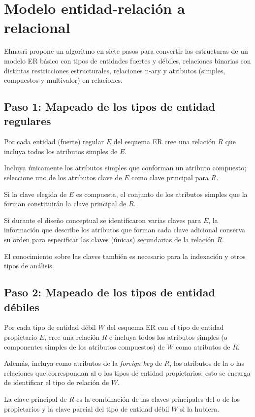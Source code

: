 \section{Modelo entidad-relación a relacional}
Elmasri\cite{ramez_elmasri_fundamentos_nodate} propone un algoritmo en siete pasos para convertir las estructuras de un modelo ER básico con tipos de entidades fuertes y débiles, relaciones binarias con distintas restricciones estructurales, relaciones n-ary y atributos (simples, compuestos y multivalor) en relaciones.

\subsection*{Paso 1: Mapeado de los tipos de entidad regulares}
Por cada entidad (fuerte) regular $E$ del esquema ER cree una relación $R$ que incluya todos los atributos simples de $E$.


Incluya únicamente los atributos simples que conforman un atributo compuesto; seleccione uno de los atributos clave de $E$ como clave principal para $R$. 


Si la clave elegida de $E$ es compuesta, el conjunto de los atributos simples que la forman constituirán la clave principal de $R$.


Si durante el diseño conceptual se identificaron varias claves para $E$, la información que describe los atributos que forman cada clave adicional conserva su orden para especificar las claves (únicas) secundarias de la relación $R$. 


El conocimiento sobre las claves también es necesario para la indexación y otros tipos de análisis.


\subsection*{Paso 2: Mapeado de los tipos de entidad débiles}
Por cada tipo de entidad débil $W$ del esquema ER con el tipo de entidad propietario $E$, cree una relación $R$ e incluya todos los atributos simples (o componentes simples de los atributos compuestos) de $W$ como atributos de $R$. 


Además, incluya como atributos de la \textit{foreign key} de $R$, los atributos de la o las relaciones que correspondan al o los tipos de entidad propietarios; esto se encarga de identificar el tipo de relación de $W$. 


La clave principal de $R$ es la combinación de las claves principales del o de los propietarios y la clave parcial del tipo de entidad débil $W$ si la hubiera.


